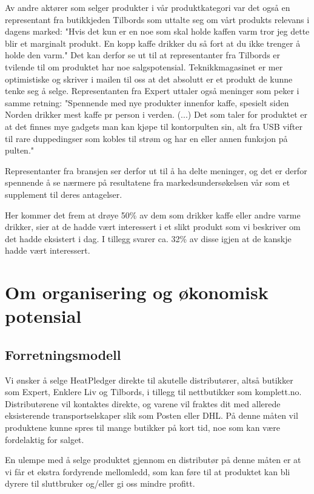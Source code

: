 Av andre aktører som selger produkter i vår produktkategori var det også en representant fra butikkjeden Tilbords som uttalte seg om vårt produkts relevans i dagens marked: "Hvis det kun er en noe som skal holde kaffen varm tror jeg dette blir et marginalt produkt. En kopp kaffe drikker du så fort at du ikke trenger å holde den varm." Det kan derfor se ut til at representanter fra Tilbords er tvilende til om produktet har noe salgspotensial. Teknikkmagasinet er mer optimistiske og skriver i mailen til oss at det absolutt er et produkt de kunne tenke seg å selge. Representanten fra Expert uttaler også meninger som peker i samme retning: "Spennende med nye produkter innenfor kaffe, spesielt siden Norden drikker mest kaffe pr person i verden. (...) Det som taler for produktet er at det finnes mye gadgets man kan kjøpe til kontorpulten sin, alt fra USB vifter til rare duppedingser som kobles til strøm og har en eller annen funksjon på pulten."

Representanter fra bransjen ser derfor ut til å ha delte meninger, og det er derfor spennende å se nærmere på resultatene fra markedsundersøkelsen vår som et supplement til deres antagelser.

Her kommer det frem at drøye 50\% av dem som drikker kaffe eller andre varme drikker, sier at de hadde vært interessert i et slikt produkt som vi beskriver om det hadde eksistert i dag. I tillegg svarer ca. 32\% av disse igjen at de kanskje hadde vært interessert.



\section{Om organisering og økonomisk potensial}
\subsection{Forretningsmodell}
Vi ønsker å selge HeatPledger direkte til akutelle distributører, altså butikker som Expert, Enklere Liv og Tilbords, i tillegg til nettbutikker som komplett.no. Distributørene vil kontaktes direkte, og varene vil fraktes dit med allerede eksisterende transportselskaper slik som Posten eller DHL. På denne måten vil produktene kunne spres til mange butikker på kort tid, noe som kan være fordelaktig for salget.

En ulempe med å selge produktet gjennom en distributør på denne måten er at vi får et ekstra fordyrende mellomledd, som kan føre til at produktet kan bli dyrere til sluttbruker og/eller gi oss mindre profitt. 

